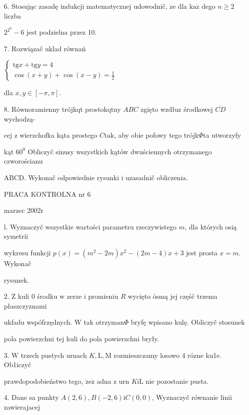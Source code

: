 \documentclass[a4paper,12pt]{article}
\begin{document}
6. Stosując zasadę indukcji matematycznej udowodnič, $\dot{\mathrm{z}}\mathrm{e}$ dla $\mathrm{k}\mathrm{a}\dot{\mathrm{z}}$ dego $n \geq 2$ liczba

$2^{2^{n}}-6$ jest podzielna przez 10.

7. Rozwiązač uklad równań

$\left\{\begin{array}{l}
\mathrm{t}\mathrm{g}x+\mathrm{t}\mathrm{g}y=4\\
\cos(x+y)+\cos(x-y)=\frac{1}{2}
\end{array}\right.$

dla $x, y\in[-\pi,\pi].$

8. Równoramienny trójkqt prostokqtny $ABC$ zgięto wzdłuz środkowej $\overline{CD}$ wychodzą-

cej $\mathrm{z}$ wierzchofka kąta prostego $C\mathrm{t}\mathrm{a}\mathrm{k}$, aby obie pofowy tego trójk$\Phi$ta utworzyfy

kąt $60^{0}$ Obliczyč sinusy wszystkich kątów dwuściennych otrzymanego czworościanu

ABCD. Wykonač odpowiednie rysunki $\mathrm{i}$ uzasadnič obliczenia.





PRACA KONTROLNA nr 6

marzec 2002r

l. Wyznaczyč wszystkie wartości parametru rzeczywistego $m$, dla których osią symetrii

wykresu funkcji $p(x)=(m^{2}-2m)x^{2}-(2m-4)x+3$ jest prosta $x=m$. Wykonač

rysunek.

2. $\mathrm{Z}$ kuli $0$ środku $\mathrm{w}$ zerze $\mathrm{i}$ promieniu $R$ wycięto ósmą jej częśč trzema płaszczyznami

ukfadu wspófrzędnych. $\mathrm{W}$ tak $\mathrm{o}\mathrm{t}\mathrm{r}\mathrm{z}\mathrm{y}\mathrm{m}\mathrm{a}\mathrm{n}\Phi$ bryfę wpisano kulę. Obliczyč stosunek

pola powierzchni tej kuli do pola powierzchni bryły.

3. $\mathrm{W}$ trzech pustych urnach $K, \mathrm{L}, \mathrm{M}$ rozmieszczamy losowo 4 rózne ku1e. Ob1iczyč

prawdopodobieństwo tego, $\dot{\mathrm{z}}\mathrm{e}\dot{\mathrm{z}}$ adna $\mathrm{z}$ urn $K\mathrm{i}\mathrm{L}$ nie pozostanie pusta.

4. Dane sa punkty $A(2,6), B(-2,6)\mathrm{i}C(0,0)$, Wyznaczyč równanie linii zawierajacej
\end{document}
